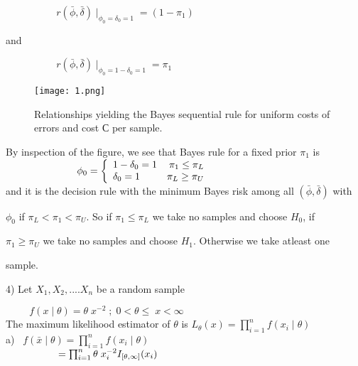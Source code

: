 \documentclass[]{article}
\begin{document}
$ \hspace{2cm}$ $r(\bar{\phi},\bar{\delta})\mid_{\phi_{0}=\delta_{0}=1}=(1-\pi_{1})$

and

$ \hspace{2cm} $
$r(\bar{\phi},\bar{\delta})\mid_{\phi_{0}=1-\delta_{0}=1}=\pi_{1} $ \\

\begin{figure}[ht!]
\centering
\texttt{[image: 1.png]}
\caption{Relationships yielding the Bayes sequential rule for uniform
costs of errors and cost С per sample. \label{overflow}}
\end{figure}

By inspection of the figure, we see that Bayes rule for a fixed prior $\pi_{1}$ is \\

$
\hspace{2.5cm}\phi_{0}=
\left\{
\begin{array}{lr}
1-\delta_{0} = 1& \pi_{1}\leq\pi_{L} \\
\delta_{0} = 1& \pi_{L}\geq\pi_{U}
\end{array}
\right.
$\\ 

and it is the decision rule with the minimum Bayes risk among all $(\bar \phi,\bar \delta)$ with

$\phi_{0}$ if $\pi_{L}<\pi_{1}<\pi_{U} $. So if $\pi_{1}\leq\pi_{L}$ we take no samples and choose $H_{0}$, if

$\pi_{1}\geq \pi_{U}$ we take no samples and choose $H_{1}$. Otherwise we take atleast one 

sample.

\begin{flushleft}
4) Let $X_1,X_2,....X_n$ be a random sample
\end{flushleft}

$\hspace{1cm}f(x\mid\theta)=\theta\;x^{-2} \; ;\;0<\theta\leq\;x<\infty$\\

The maximum likelihood estimator of $\theta$ is $L_\theta(x) = \prod_{i=1}^{n} f(x_i\mid\theta)$\\

a)$\;\;\;f(\bar{x}\mid\theta)= \prod_{i=1}^{n} f(x_i\mid\theta)$\\

$\hspace{1.85cm}=\prod_{i=1}^{n} \theta\;x_{i}^{-2} I_{[\theta,\infty]}(x_{i})$\\
\end{document}
